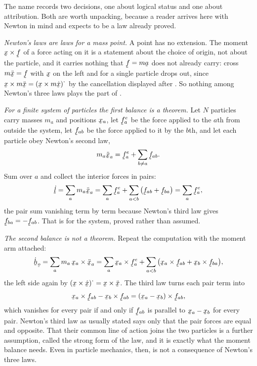 \begin{remark}%
\label{rem:ch6whypostulate}
The name records two decisions, one about logical status and one about
attribution. Both are worth unpacking, because a reader arrives here
with Newton in mind and expects  to be a law already proved.

\emph{Newton's laws are laws for a mass point.} A point has no
extension. The moment $\bx\times\vek{f}$ of a force acting on it is a
statement about the choice of origin, not about the particle, and it
carries nothing that $\vek{f}=m\ba$ does not already carry: cross
$m\ddot\bx=\vek{f}$ with $\bx$ on the left and  for a single
particle drops out, since $\bx\times m\ddot\bx
=(\bx\times m\dot\bx)^{\textstyle\cdot}$ by the cancellation displayed
after . So nothing among Newton's three laws plays the part of
.

\emph{For a finite system of particles the first balance is a theorem.}
Let $N$ particles carry masses $m_{a}$ and positions $\bx_{a}$, let
$\vek{f}^{e}_{a}$ be the force applied to the $a$th from outside the
system, let $\vek{f}_{ab}$ be the force applied to it by the $b$th, and
let each particle obey Newton's second law,
\[
   m_{a}\ddot\bx_{a}=\vek{f}^{e}_{a}+\sum_{b\neq a}\vek{f}_{ab} .
\]
Sum over $a$ and collect the interior forces in pairs:
\[
   \dot{\vek{l}}=\sum_{a}m_{a}\ddot\bx_{a}
   =\sum_{a}\vek{f}^{e}_{a}
   +\sum_{a<b}\big(\vek{f}_{ab}+\vek{f}_{ba}\big)
   =\sum_{a}\vek{f}^{e}_{a} ,
\]
the pair sum vanishing term by term because Newton's third law gives
$\vek{f}_{ba}=-\vek{f}_{ab}$. That is  for the system, proved
rather than assumed.

\emph{The second balance is not a theorem.} Repeat the computation with
the moment arm attached:
\[
   \dot{\bh}_{\bo}=\sum_{a}m_{a}\,\bx_{a}\times\ddot\bx_{a}
   =\sum_{a}\bx_{a}\times\vek{f}^{e}_{a}
   +\sum_{a<b}\big(\bx_{a}\times\vek{f}_{ab}
                  +\bx_{b}\times\vek{f}_{ba}\big),
\]
the left side again by $(\bx\times\dot\bx)^{\textstyle\cdot}
=\bx\times\ddot\bx$. The third law turns each pair term into
\[
   \bx_{a}\times\vek{f}_{ab}-\bx_{b}\times\vek{f}_{ab}
   =(\bx_{a}-\bx_{b})\times\vek{f}_{ab} ,
\]
which vanishes for every pair if and only if $\vek{f}_{ab}$ is parallel
to $\bx_{a}-\bx_{b}$ for every pair. Newton's third law as usually
stated says only that the pair forces are equal and opposite. That their
common line of action joins the two particles is a further assumption,
called the strong form of the law, and it is exactly what the moment
balance needs. Even in particle mechanics, then,  is not a
consequence of Newton's three laws.


\end{remark}
